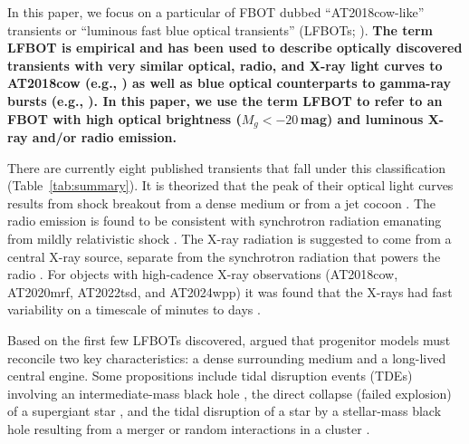 \documentclass[twocolumn,twocolappendix, linenumbers, trackchanges]{aastex7}
\begin{document}
In this paper, we focus on a particular  of FBOT dubbed ``AT2018cow-like'' transients \citep{ho2023} or ``luminous fast blue optical transients'' (LFBOTs; \citealt{metzger2022, Klencki2025}). \textbf{The term LFBOT is empirical and has been used to describe optically discovered transients with very similar optical, radio, and X-ray light curves to AT2018cow (e.g., \citealt{coppejans2020, Gutierrez2024, perley2021, ho2022xnd, bright2022, lebaron2025, nayana2025, Perley2026}) as well as blue optical counterparts to gamma-ray bursts (e.g., \citealt{Pieterse2026}). In this paper, we use the term LFBOT to refer to an FBOT with high optical brightness ($M_g < -20\,$mag) and luminous X-ray and/or radio emission.}

There are currently eight published transients  that fall under this  classification (Table~\ref{tab:summary}). %
It is theorized that the peak of their optical light curves results from shock breakout from a dense medium \citep{ofek2010, pursiainen2018} or from a jet cocoon \citep{gottlieb2022}. The radio emission is found to be consistent with synchrotron radiation emanating from  mildly relativistic shock \citep{margutti,coppejans2020,ho2020koala}.  The X-ray radiation is suggested to come from a central X-ray source, separate from the synchrotron radiation that powers the radio \citep{margutti,ho2019}. For objects with high-cadence X-ray observations (AT2018cow, AT2020mrf, AT2022tsd, and AT2024wpp) it was found that the X-rays had fast variability on a timescale of minutes to days \citep{sandoval2018,margutti,yao2022, ho2023tsd, nayana2025,Perley2026}.

Based on the first few LFBOTs discovered, \citet{metzger2022} argued that progenitor models must reconcile two key characteristics: a dense surrounding medium and a long-lived central engine. Some propositions include tidal disruption events (TDEs) involving an intermediate-mass black hole \citep{perley2019,kuin2019,Gutierrez2024}, the direct collapse (failed explosion) of a supergiant star \citep{margutti,perley2019,Chrimes2025}, and the tidal disruption of a star by a stellar-mass black hole resulting from a merger \citep{metzger2022, Klencki2025} or random interactions in a cluster \citep{Kremer2021,Kremer2023}. 
\end{document}
